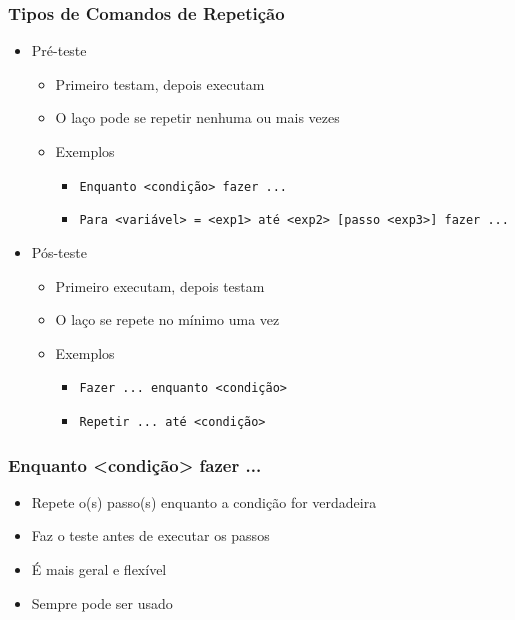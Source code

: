 \documentclass[xcolor={dvipsnames,table},aspectratio=169]{beamer}
\begin{document}
\begin{frame}[fragile]\frametitle{Tipos de Comandos de Repetição}
\begin{itemize}
	\item Pré-teste
	\begin{itemize}
		\item Primeiro testam, depois executam
		\item O laço pode se repetir nenhuma ou mais vezes
		\item Exemplos\\
		\begin{itemize}
			\item \texttt{Enquanto <condição> fazer ...}
			\item \texttt{Para <variável> = <exp1> até <exp2> [passo <exp3>] fazer ...}
		\end{itemize}
	\end{itemize}
	\item Pós-teste
	\begin{itemize}
		\item Primeiro executam, depois testam
		\item O laço se repete no mínimo uma vez
		\item Exemplos
		\begin{itemize}
			\item \texttt{Fazer ... enquanto <condição>}
			\item \texttt{Repetir ... até <condição>}
		\end{itemize}
	\end{itemize}
\end{itemize}
\end{frame}

\begin{frame}[fragile]\frametitle{Enquanto <condição> fazer ...}
\begin{itemize}
	\item Repete o(s) passo(s) enquanto a condição for verdadeira
	\item Faz o teste antes de executar os passos
	\item É mais geral e flexível
	\item Sempre pode ser usado
\end{itemize}
\end{frame}
\end{document}
